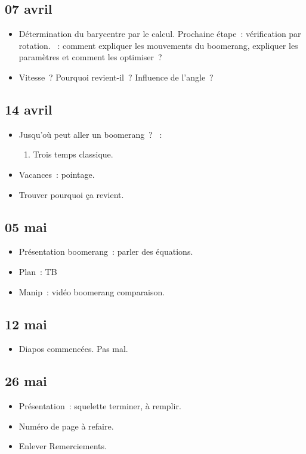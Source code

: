 \documentclass[a4paper, 11pt, final, garamond]{book}
\begin{document}
\subsection{07 avril}
\begin{itemize}
  \item Détermination du barycentre par le calcul. Prochaine étape~:
    vérification par rotation.
  ~: comment expliquer les mouvements du boomerang, expliquer les
    paramètres et comment les optimiser~?
  \item Vitesse~? Pourquoi revient-il~? Influence de l'angle~?
\end{itemize}

\subsection{14 avril}
\begin{itemize}
  \item Jusqu'où peut aller un boomerang~?
  ~:
    \begin{enumerate}[label=\Roman*]
      \item Trois temps classique.
    \end{enumerate}
  \item Vacances~: pointage.
  \item Trouver pourquoi ça revient.
\end{itemize}

\subsection{05 mai}
\begin{itemize}
  \item Présentation boomerang~: parler des équations.
  \item Plan~: TB
  \item Manip~: vidéo boomerang comparaison.
\end{itemize}

\subsection{12 mai}
\begin{itemize}
  \item Diapos commencées. Pas mal.
\end{itemize}

\subsection{26 mai}
\begin{itemize}
  \item Présentation~: squelette terminer, à remplir.
  \item Numéro de page à refaire.
  \item Enlever Remerciements.
\end{itemize}
\end{document}

